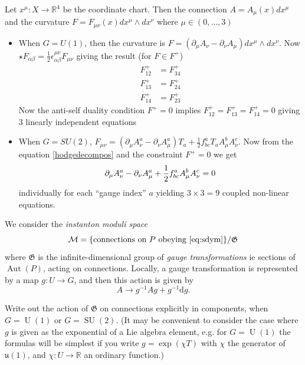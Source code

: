\documentclass[12pt,letterpaper,reqno]{article}
\numberwithin{equation}{section}
\newcommand{\fG}{{\mathfrak G}}
\newcommand{\cM}{\ensuremath{\mathcal M}}
\newcommand{\R}{\ensuremath{\mathbb R}}
\newcommand{\de}{\mathrm{d}}
\newcommand{\ti}[1]{\textit{#1}}
\DeclareMathOperator{\Aut}{Aut}
\DeclareMathOperator{\SU}{SU}
\DeclareMathOperator{\U}{U}
\begin{document}
\begin{solution}
  Let $x^\mu:X\to\R^4$ be the coordinate chart.  Then the connection $A=A_\mu(x) dx^\mu$ and the curvature $F=F_{\mu\nu}(x)dx^\mu\wedge dx^\nu$ where $\mu\in (0,\ldots,3)$
  \begin{itemize}
  \item When $G=U(1)$, then the curvature is $F = (\partial_\mu A_\nu-\partial_\nu A_\mu)dx^\mu\wedge dx^\nu$.  Now $\star F_{\alpha\beta}=\frac{1}{2}\epsilon^{\mu\nu}_{\alpha\beta}F_{\mu\nu}$ giving the result (for $F\in F^+$)
    \begin{equation}
      \label{hodgedecompos}
      \begin{split}
        F_{12}^+&=F_{34}^+\\
        F_{13}^+&=F_{24}^+\\
        F_{14}^+&=F_{23}^+
      \end{split}
    \end{equation}
Now the anti-self duality condition $F^+=0$ implies $F_{12}^+=F_{13}^+=F_{14}^+=0$ giving 3 linearly independent equations
\item When $G=SU(2)$, $F_{\mu\nu}=(\partial_\mu A_{\nu}^a-\partial_{\nu}A_{\mu}^a)T_a+\frac{1}{2}f_{bc}^aT_aA^b_{\mu}A^c_{\nu}$.   Now from the equation \ref{hodgedecompos} and the constraint $F^+=0$ we get
  \begin{equation}
    \partial_\mu A_\nu^a-\partial_\nu A_\mu^a+\frac{1}{2}f^a_{bc}A_\mu^b A_\nu^c=0\\
  \end{equation}
individually for each ``gauge index'' $a$ yielding $3\times 3=9$ coupled non-linear equations. 
  \end{itemize}
\end{solution}

We consider the \ti{instanton moduli space}
\begin{equation}
  \cM = \{ \text{connections on $P$ obeying \eqref{eq:sdym}} \} / \fG
\end{equation}
where $\fG$ is the infinite-dimensional group of \ti{gauge transformations} ie
sections of $\Aut(P)$, acting on connections. Locally, a gauge transformation
is represented by a map $g: U \to G$, and then
this action is given by
\begin{equation}
  A \to g^{-1} A g + g^{-1} \de g.
\end{equation}

\begin{exercise}
Write out the action of $\fG$ on connections
explicitly in components, when $G = \U(1)$ or $G = \SU(2)$.
(It may be convenient to consider the case where $g$ is given as
the exponential of a Lie algebra element, e.g. for $G = \U(1)$
the formulas will be simplest if you write $g = \exp(\chi T)$ with $\chi$
the generator of ${\mathfrak u}(1)$, and $\chi: U \to \R$ an ordinary function.)
\end{exercise}
\end{document}
